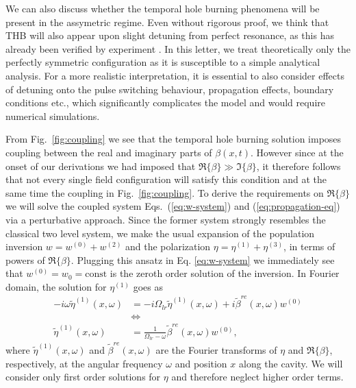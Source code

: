 \documentclass[onecolumn,secnumarabic,amssymb, nobibnotes, aip, prd]{revtex4-1}
\def\t{\tilde}
\def\om{\omega}
\begin{document}
\begin{appendices}
We can also discuss whether the temporal hole burning phenomena will be present in the assymetric regime. Even without rigorous proof, we think that THB will also appear upon slight detuning from perfect resonance, as this has already been verified by experiment \cite{burghoff2015evaluating}. In this letter, we treat theoretically only the perfectly symmetric configuration as it is susceptible to a simple analytical analysis. For a more realistic interpretation, it is essential to also consider effects of detuning onto the pulse switching behaviour, propagation effects, boundary conditions etc., which significantly complicates the model and would require numerical simulations.


From Fig.~\ref{fig:coupling} we see that the temporal hole burning solution imposes coupling between the real and imaginary parts of $\beta(x,t)$. However since at the onset of our derivations we had imposed that $\Re\{\beta\} \gg \Im\{\beta\}$, it therefore follows that not every single field configuration will satisfy this condition and at the same time the coupling in Fig.~\ref{fig:coupling}. To derive the requirements on $\Re\{\beta\}$ we will solve the coupled system Eqs.~(\ref{eq:w-system}) and (\ref{eq:propagation-eq}) via a perturbative approach. Since the former system strongly resembles the classical two level system, we make the usual expansion of the population inversion $w=w^{(0)} + w^{(2)}$ and the polarization $\eta = \eta^{(1)} + \eta^{(3)}$, in terms of powers of $\Re\{\beta\}$. Plugging this ansatz in Eq. \ref{eq:w-system} we immediately see that $w^{(0)} = w_0 = \text{const}$ is the zeroth order solution of the inversion. In Fourier domain, the solution for $\eta^{(1)}$ goes as
\begin{align}
-i\om\t\eta^{(1)}(x,\om) &= -i\Omega_{lr}\t\eta^{(1)}(x,\om) +i\t\beta^{re}(x,\om)w^{(0)} \nonumber \\
	&\Leftrightarrow \nonumber \\
	\t\eta^{(1)}(x,\om) &= \frac{1}{\Omega_{lr}-\om}\t\beta^{re}(x,\om)w^{(0)}, \label{eq:eta-1-solution} 
\end{align}
where $\t\eta^{(1)}(x,\om) $ and $\tilde\beta^{re}(x,\om)$ are the Fourier transforms of $\eta$ and $\Re\{\beta\}$, respectively, at the angular frequency $\omega$ and position $x$ along the cavity. We will consider only first order solutions for $\eta$ and therefore neglect higher order terms. 


\end{appendices}
\end{document}
